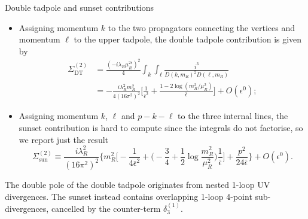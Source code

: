 \documentclass[aspectratio=169,10pt]{beamer}
\newcommand{\bepsilon}{\bar{\epsilon}}
\begin{document}
\begin{frame}{Double tadpole and sunset contributions}
    \begin{itemize}
        \item Assigning momentum $k$ to the two propagators connecting the vertices and momentum $\ell$ to the upper tadpole, the double tadpole contribution is given by
        \begin{equation}
            \begin{aligned}
                \Sigma^{(2)}_{\mathrm{DT}}  &= \frac{(-i\lambda_R\mu_R^{2\epsilon})^2}{4} \int_k\int_\ell\frac{i^3}{D(k,m_R)^2D(\ell,m_R)} \\
                &= -\frac{i\lambda_R^2m_R^2}{4(16\pi^2)^2}\bigg[\frac{1}{\bar{\epsilon}^2} + \frac{1-2\log{(m_R^2/\mu_R^2)}}{\bar{\epsilon}}\bigg] + O(\epsilon^0);
            \end{aligned}
        \end{equation}
        \item Assigning momentum $k$, $\ell$ and $p - k -\ell$ to the three internal lines, the sunset contribution is hard to compute since the integrals do not factorise, so we report just the result
        \begin{equation}
            \Sigma^{(2)}_{\mathrm{sun}} \equiv \frac{i\lambda_R^2}{(16\pi^2)^2}\bigg\{m_R^2\bigg[-\frac{1}{4\bepsilon^2} + \bigg(-\frac{3}{4} + \frac{1}{2}\log{\frac{m_R^2}{\mu_R^2}}\bigg)\frac{1}{\bepsilon}\bigg] + \frac{p^2}{24\bepsilon}\bigg\} + O(\epsilon^0).
        \end{equation}
    \end{itemize}
    The double pole of the double tadpole originates from nested 1-loop UV divergences. The sunset instead contains overlapping 1-loop 4-point sub-divergences, cancelled by the counter-term $\delta_3^{(1)}$.
\end{frame}
\end{document}

